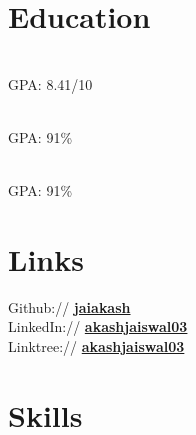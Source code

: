 \documentclass[]{deedy-resume-openfont}
\begin{document}
    
%
%

 
\begin{minipage}[t]{0.3\textwidth}

%
%
\section{Education}
\raggedright

\hfill {}\\
GPA: 8.41/10\\
\sectionsep
  

\hfill {}\\
GPA: 91\%\\
\sectionsep
  

\hfill {}\\
GPA: 91\%\\
\sectionsep


\section{Links} 
Github:// \href{https://github.com/jaiakash}{\bf jaiakash} \\
LinkedIn://  \href{https://www.linkedin.com/in/akashjaiswal03}{\bf akashjaiswal03} \\
Linktree://  \href{https://linktr.ee/akashjaiswal03}{\bf akashjaiswal03} \\

%
%

\section{Skills}

\end{minipage}
\end{document}
